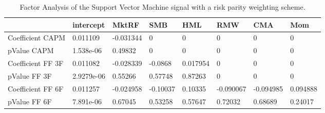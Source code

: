 \begin{table}[H]
\centering
\begin{tabular}{llllllll}
& intercept & MktRF & SMB & HML & RMW & CMA & Mom \\ 
\hline 
Coefficient CAPM & 0.011109 & -0.031344 & 0 & 0 & 0 & 0 & 0 \\ 
pValue CAPM & 1.538e-06 & 0.49832 & 0 & 0 & 0 & 0 & 0 \\ 
Coefficient FF 3F & 0.011082 & -0.028339 & -0.0868 & 0.017954 & 0 & 0 & 0 \\ 
pValue FF 3F & 2.9279e-06 & 0.55266 & 0.57748 & 0.87263 & 0 & 0 & 0 \\ 
Coefficient FF 6F & 0.011257 & -0.024958 & -0.10037 & 0.10335 & -0.090067 & -0.094985 & 0.094888 \\ 
pValue FF 6F & 7.891e-06 & 0.67045 & 0.53258 & 0.57647 & 0.72032 & 0.68689 & 0.24017 \\ 
\hline
\end{tabular}
\caption{Factor Analysis of the Support Vector Machine signal with a risk parity weighting scheme.}
\label{SVM_MODEL_Risk_FACTOR}
\end{table}